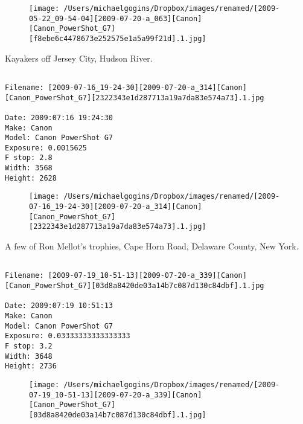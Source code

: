 \begin{figure}
\texttt{[image: /Users/michaelgogins/Dropbox/images/renamed/[2009-05-22\_09-54-04][2009-07-20-a\_063][Canon][Canon\_PowerShot\_G7][f8ebe6c4478673e252575e1a5a99f21d].1.jpg]}
\end{figure}
    
\clearpage
\onecolumn
\noindent Kayakers off Jersey City, Hudson River.
\noindent
\begin{lstlisting}

Filename: [2009-07-16_19-24-30][2009-07-20-a_314][Canon][Canon_PowerShot_G7][2322343e1d287713a19a7da83e574a73].1.jpg

Date: 2009:07:16 19:24:30
Make: Canon
Model: Canon PowerShot G7
Exposure: 0.0015625
F stop: 2.8
Width: 3568
Height: 2628
\end{lstlisting}
\clearpage

\begin{figure}
\texttt{[image: /Users/michaelgogins/Dropbox/images/renamed/[2009-07-16\_19-24-30][2009-07-20-a\_314][Canon][Canon\_PowerShot\_G7][2322343e1d287713a19a7da83e574a73].1.jpg]}
\end{figure}
    
\clearpage
\onecolumn
\noindent A few of Ron Mellot's trophies, Cape Horn Road, Delaware County, New York.
\noindent
\begin{lstlisting}

Filename: [2009-07-19_10-51-13][2009-07-20-a_339][Canon][Canon_PowerShot_G7][03d8a8420de03a14b7c087d130c84dbf].1.jpg

Date: 2009:07:19 10:51:13
Make: Canon
Model: Canon PowerShot G7
Exposure: 0.03333333333333333
F stop: 3.2
Width: 3648
Height: 2736
\end{lstlisting}
\clearpage

\begin{figure}
\texttt{[image: /Users/michaelgogins/Dropbox/images/renamed/[2009-07-19\_10-51-13][2009-07-20-a\_339][Canon][Canon\_PowerShot\_G7][03d8a8420de03a14b7c087d130c84dbf].1.jpg]}
\end{figure}
    
